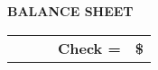 \documentclass{letter}
\begin{document}
\thispagestyle{empty}

\vspace{1 cm}

\centering\Large\textbf{BALANCE SHEET}\normalsize

\begin{tabularx}{\linewidth}{l X X r r}


& & & \centering\Large\bf
Check =
& \centering\Large\bf
\$ %

\end{tabularx}

\vspace{1 cm}
\end{document}
